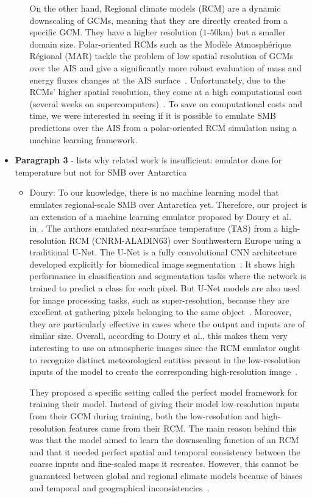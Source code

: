 \documentclass[a4paper,11pt,oneside]{report}
\begin{document}
\begin{itemize}
\begin{itemize}
        On the other hand, Regional climate models (RCM) are a dynamic downscaling of GCMs, meaning that they are directly created from a specific GCM. They have a higher resolution ($1$-$50$\si{km}) but a smaller domain size. Polar-oriented RCMs such as the Modèle Atmosphérique Régional (MAR) tackle the problem of low spatial resolution of GCMs over the AIS and give a significantly more robust evaluation of mass and energy fluxes changes at the AIS surface~\cite{Kittel, Fyke2018}. Unfortunately, due to the RCMs' higher spatial resolution, they come at a high computational cost (several weeks on supercomputers)~\cite{Doury}. To save on computational costs and time, we were interested in seeing if it is possible to emulate SMB predictions over the AIS from a polar-oriented RCM simulation using a machine learning framework. 
    \end{itemize}
    \item \textbf{Paragraph 3} - lists why related work is insufficient: emulator done for temperature but not for SMB over Antarctica
    \begin{itemize}
        \item Doury: To our knowledge, there is no machine learning model that emulates regional-scale SMB over Antarctica yet. Therefore, our project is an extension of a machine learning emulator proposed by Doury et al. in~\cite{Doury}. The authors emulated near-surface temperature (TAS) from a high-resolution RCM (CNRM-ALADIN63) over Southwestern Europe using a traditional U-Net. The U-Net is a fully convolutional CNN architecture developed explicitly for biomedical image segmentation~\cite{Ronneberger2015}. It shows high performance in classification and segmentation tasks where the network is trained to predict a class for each pixel. But U-Net models are also used for image processing tasks, such as super-resolution, because they are excellent at gathering pixels belonging to the same object~\cite{Doury}. Moreover, they are particularly effective in cases where the output and inputs are of similar size. Overall, according to Doury et al., this makes them very interesting to use on atmospheric images since the RCM emulator ought to recognize distinct meteorological entities present in the low-resolution inputs of the model to create the corresponding high-resolution image~\cite{Doury}. 
   
        They proposed a specific setting called the perfect model framework for training their model. Instead of giving their model low-resolution inputs from their GCM during training, both the low-resolution and high-resolution features came from their RCM. The main reason behind this was that the model aimed to learn the downscaling function of an RCM and that it needed perfect spatial and temporal consistency between the coarse inputs and fine-scaled maps it recreates. However, this cannot be guaranteed between global and regional climate models because of biases and temporal and geographical inconsistencies~\cite{Doury, Sanchez2009, Sanchez2018}. 
        

\end{itemize}
\end{itemize}
\end{document}
